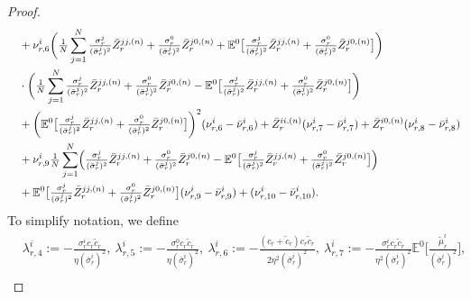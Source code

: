 \documentclass[10pt,a4paper]{amsart}
\begin{document}
\begin{proof}
\begin{align}
&\ \ \ + \nu_{r,6}^{i}\biggl(\tfrac{1}{N}\sum_{j=1}^{N}\tfrac{\sigma_{r}^{j}}{(\bar{\sigma}_{r}^{j})^{2}}\bar{Z}_{r}^{jj,(n)} + \tfrac{\sigma_{r}^{0}}{(\bar{\sigma}_{r}^{j})^{2}}\bar{Z}_{r}^{j0,(n)} + \mathbb{E}^{0}\bigl[\tfrac{\sigma_{r}^{j}}{(\bar{\sigma}_{r}^{j})^{2}}\bar{Z}_{r}^{jj,(n)}+\tfrac{\sigma_{r}^{0}}{(\bar{\sigma}_{r}^{j})^{2}}\bar{Z}_{r}^{j0,(n)}\bigr]\biggr) \nonumber \\
&\ \ \ \cdot\biggl(\tfrac{1}{N}\sum_{j=1}^{N}\tfrac{\sigma_{r}^{j}}{(\bar{\sigma}_{r}^{j})^{2}}\bar{Z}_{r}^{jj,(n)} + \tfrac{\sigma_{r}^{0}}{(\bar{\sigma}_{r}^{j})^{2}}\bar{Z}_{r}^{j0,(n)} - \mathbb{E}^{0}\bigl[\tfrac{\sigma_{r}^{j}}{(\bar{\sigma}_{r}^{j})^{2}}\bar{Z}_{r}^{jj,(n)}+\tfrac{\sigma_{r}^{0}}{(\bar{\sigma}_{r}^{j})^{2}}\bar{Z}_{r}^{j0,(n)}\bigr]\biggr) \nonumber \\
&\ \ \ + \biggl(\mathbb{E}^{0}\bigl[\tfrac{\sigma_{r}^{j}}{(\bar{\sigma}_{r}^{j})^{2}}\bar{Z}_{r}^{jj,(n)}+\tfrac{\sigma_{r}^{0}}{(\bar{\sigma}_{r}^{j})^{2}}\bar{Z}_{r}^{j0,(n)}\bigr]\biggr)^{2}(\nu_{r,6}^{i}-\bar{\nu}_{r,6}^{i}) + \bar{Z}_{r}^{ii,(n)}(\nu_{r,7}^{i}-\bar{\nu}_{r,7}^{i}) + \bar{Z}_{r}^{i0,(n)}(\nu_{r,8}^{i}-\bar{\nu}_{r,8}^{i}) \nonumber \\
&\ \ \ + \nu_{r,9}^{i}\tfrac{1}{N}\sum_{j=1}^{N}\Bigl(\tfrac{\sigma_{r}^{j}}{(\bar{\sigma}_{r}^{j})^{2}}\bar{Z}_{r}^{jj,(n)} + \tfrac{\sigma_{r}^{0}}{(\bar{\sigma}_{r}^{j})^{2}}\bar{Z}_{r}^{j0,(n)} - \mathbb{E}^{0}\bigl[\tfrac{\sigma_{r}^{j}}{(\bar{\sigma}_{r}^{j})^{2}}\bar{Z}_{r}^{jj,(n)}+\tfrac{\sigma_{r}^{0}}{(\bar{\sigma}_{r}^{j})^{2}}\bar{Z}_{r}^{j0,(n)}\bigr]\Bigr) \nonumber \\
&\ \ \ + \mathbb{E}^{0}\bigl[\tfrac{\sigma_{r}^{j}}{(\bar{\sigma}_{r}^{j})^{2}}\bar{Z}_{r}^{jj,(n)}+\tfrac{\sigma_{r}^{0}}{(\bar{\sigma}_{r}^{j})^{2}}\bar{Z}_{r}^{j0,(n)}\bigr](\nu_{r,9}^{i}-\bar{\nu}_{r,9}^{i}) + (\nu_{r,10}^{i}-\bar{\nu}_{r,10}^{i}). \nonumber 
\end{align}
To simplify notation, we define
\begin{align}
&\lambda_{r,4}^{i} := -\tfrac{\sigma_{r}^{i}c_{r}\tilde{c}_{r}}{\eta(\bar{\sigma}_{r}^{i})^{2}}, \ 
\lambda_{r,5}^{i} := -\tfrac{\sigma_{r}^{0}c_{r}\tilde{c}_{r}}{\eta(\bar{\sigma}_{r}^{i})^{2}}, \ 
\lambda_{r,6}^{i} := -\tfrac{(c_{r}+\tilde{c}_{r})c_{r}\tilde{c}_{r}}{2\eta^{2}(\bar{\sigma}_{r}^{i})^{2}}, \  
\lambda_{r,7}^{i} := -\tfrac{\sigma_{r}^{i}c_{r}\tilde{c}_{r}}{\eta^{2}(\bar{\sigma}_{r}^{i})^{2}}\mathbb{E}^{0}\bigl[\tfrac{\tilde{\mu}_{r}^{i}}{(\bar{\sigma}_{r}^{i})^{2}}\bigr],
\label{equ:def_lambda4} \\

\end{align}
\end{proof}
\end{document}
